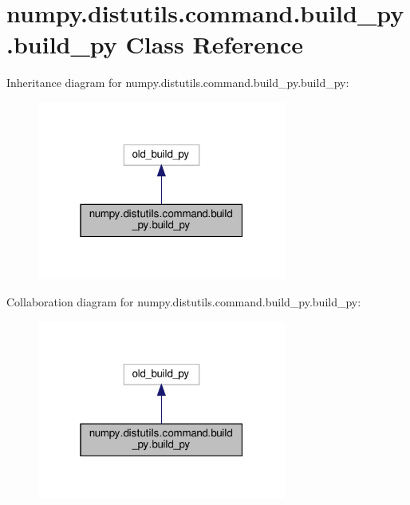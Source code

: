 \hypertarget{classnumpy_1_1distutils_1_1command_1_1build__py_1_1build__py}{}\section{numpy.\+distutils.\+command.\+build\+\_\+py.\+build\+\_\+py Class Reference}
\label{classnumpy_1_1distutils_1_1command_1_1build__py_1_1build__py}


Inheritance diagram for numpy.\+distutils.\+command.\+build\+\_\+py.\+build\+\_\+py\+:
\nopagebreak
\begin{figure}[H]
\begin{center}
\leavevmode
\includegraphics[width=232pt]{classnumpy_1_1distutils_1_1command_1_1build__py_1_1build__py__inherit__graph}
\end{center}
\end{figure}


Collaboration diagram for numpy.\+distutils.\+command.\+build\+\_\+py.\+build\+\_\+py\+:
\nopagebreak
\begin{figure}[H]
\begin{center}
\leavevmode
\includegraphics[width=232pt]{classnumpy_1_1distutils_1_1command_1_1build__py_1_1build__py__coll__graph}
\end{center}
\end{figure}
